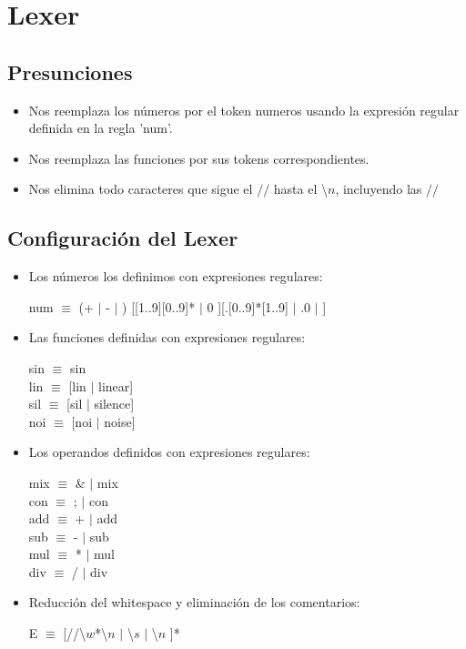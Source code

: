 \documentclass[a4paper]{article}
\begin{document}
\section{Lexer}

\subsection{Presunciones }
\begin{itemize}
\item Nos reemplaza los números por el token numeros usando la expresión regular definida en la regla 'num'.
\item Nos reemplaza las funciones por sus tokens correspondientes.
\item Nos elimina todo caracteres que sigue el $//$ hasta el \textbackslash$n$, incluyendo las $//$
\end{itemize}

\subsection{Configuración del Lexer }
\begin{itemize}

\item Los números los definimos con expresiones regulares:
\begin{center}
num $\equiv$ (+ $|$ - $|$ ) [[1..9][0..9]* $|$ 0 ][.[0..9]*[1..9] $|$ .0 $|$ ]
\end{center}

\item Las funciones definidas con expresiones regulares:
\begin{center}
sin $\equiv$ sin \\ 						
lin $\equiv$ [lin $|$ linear] \\
sil $\equiv$ [sil $|$ silence] \\
noi $\equiv$ [noi $|$ noise] \\
\end{center}

\item Los operandos definidos con expresiones regulares:
\begin{center}
mix $\equiv$ \& $|$ mix \\
con $\equiv$ ; $|$ con \\
add $\equiv$ + $|$ add \\
sub $\equiv$ - $|$ sub \\
mul $\equiv$ * $|$ mul \\
div $\equiv$ / $|$ div
\end{center}

\item Reducción del whitespace y eliminación de los comentarios:

\begin{center}
E $\equiv$ [//\textbackslash$w$*\textbackslash$n$ $|$ \textbackslash$s$ $|$ \textbackslash$n$ ]*  
\end{center}

\end{itemize}
\end{document}
